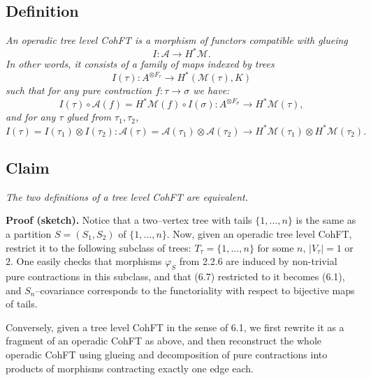 \documentclass[reqno]{amsart}
\theoremstyle{definition}
\begin{document}
\subsection{Definition}
{\it
  An operadic tree level CohFT
  is a morphism of functors compatible with glueing
  \[
    I\colon \mathcal{A}\to H^*\mathcal{M} .
  \]
  In other words, it consists of a family of maps indexed by trees
  \[
    I(\tau )\colon {A}^{\otimes F_{\tau}}\to H^*(\mathcal{M}(\tau ),K)
  \]
  such that for any pure contraction $f\colon \tau\to\sigma$ we have:
  \begin{equation*}
    I(\tau )\circ \mathcal{A}(f)
    =H^*\mathcal{M}(f)\circ I(\sigma ) \colon
    {A}^{\otimes F_{\sigma}}\to H^*\mathcal{M}(\tau ),
    \tag{6.8}
  \end{equation*}
  and for any $\tau$ glued from $\tau_1,\tau_2$,
  \begin{equation*}
    I(\tau )=I(\tau_1 )\otimes I(\tau_2) \colon
    \mathcal{A}(\tau )=\mathcal{A}(\tau_1)\otimes\mathcal{A}(\tau_2)
    \to
    H^*\mathcal{M}(\tau_1)\otimes H^*\mathcal{M}(\tau_2).
    \tag{6.9}
  \end{equation*}
}

\medskip

\subsection{Claim}
{\it
  The two definitions of a tree level
  CohFT are equivalent.
}

\smallskip

\textbf{Proof (sketch).}
Notice that a two--vertex tree with tails
$\{ 1,\dots ,n\}$ is the same as a partition $S=(S_1,S_2)$
of $\{ 1,\dots ,n\} $. Now, given an operadic tree level CohFT,
restrict it to the following subclass of trees:
$T_{\tau}= \{ 1,\dots ,n\}$ for some $n$, $|V_{\tau}|=1$ or $2$.
One easily checks that morphisms $\varphi_S$ from 2.2.6
are induced by non-trivial pure contractions in this subclass,
and that (6.7) restricted to it becomes (6.1), and
$S_n$--covariance corresponds to the functoriality with respect
to bijective maps of tails.

\smallskip

Conversely, given a tree level CohFT in the sense of 6.1,
we first rewrite it as a fragment of an operadic CohFT as above,
and then reconstruct the whole operadic CohFT using glueing
and decomposition of pure contractions into products
of morphisms contracting exactly one edge each.
\end{document}
